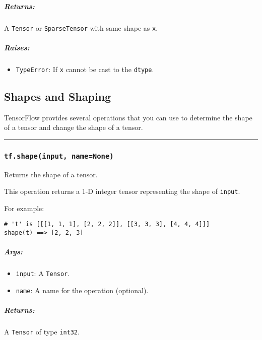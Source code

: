 \subparagraph{Returns: }\label{returns-6}

A \lstinline{Tensor} or \lstinline{SparseTensor} with same shape as
\lstinline{x}.

\subparagraph{Raises: }\label{raises-5}

\begin{itemize}
\tightlist
\item
  \lstinline{TypeError}: If \lstinline{x} cannot be cast to the
  \lstinline{dtype}.
\end{itemize}

\subsection{Shapes and Shaping }\label{shapes-and-shaping}

TensorFlow provides several operations that you can use to determine the
shape of a tensor and change the shape of a tensor.

\begin{center}\rule{0.5\linewidth}{\linethickness}\end{center}

\subsubsection{\texorpdfstring{\lstinline{tf.shape(input, name=None)}
}{tf.shape(input, name=None) }}\label{tf.shapeinput-namenone}

Returns the shape of a tensor.

This operation returns a 1-D integer tensor representing the shape of
\lstinline{input}.

For example:

\begin{lstlisting}
# 't' is [[[1, 1, 1], [2, 2, 2]], [[3, 3, 3], [4, 4, 4]]]
shape(t) ==> [2, 2, 3]
\end{lstlisting}

\subparagraph{Args: }\label{args-7}

\begin{itemize}
\tightlist
\item
  \lstinline{input}: A \lstinline{Tensor}.
\item
  \lstinline{name}: A name for the operation (optional).
\end{itemize}

\subparagraph{Returns: }\label{returns-7}

A \lstinline{Tensor} of type \lstinline{int32}.

